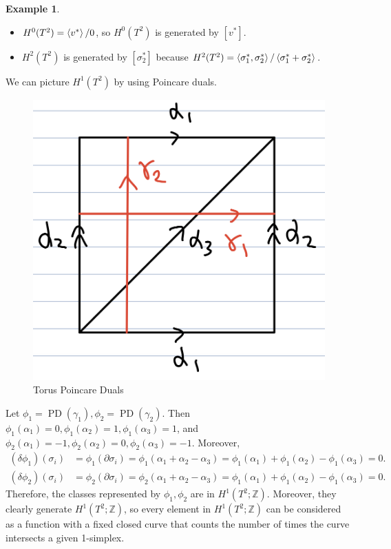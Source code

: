 \documentclass[psamsfonts]{amsart}
\theoremstyle{definition}
\newtheorem{exmp}[thm]{Example}
\theoremstyle{rem}
\DeclareMathOperator{\PD}{PD}
\numberwithin{equation}{section}
\begin{document}
\begin{exmp}
  \begin{itemize}
    \item
      $H^0(T^2) = \ev{v^{\ast}} / 0$, so $H^0(T^2)$ is generated by $[v^{\ast}]$.
    \item
      $H^2(T^2)$ is generated by $[\sigma_2^{\ast}]$ because $H^2(T^2) = \ev{\sigma_1^{\ast}, \sigma_2^{\ast}} / \ev{\sigma_1^{\ast} + \sigma_2^{\ast}}$.
  \end{itemize}
  We can picture $H^1(T^2)$ by using Poincare duals.
  \begin{figure}[!htb]
    \includegraphics[width=.5\linewidth]{img/torus_pd.jpeg}
    \caption{Torus Poincare Duals}
    \label{fig:torus_pds}
  \end{figure}
  Let $\phi_1 = \PD(\gamma_1), \phi_2 = \PD(\gamma_2)$.
  Then $\phi_1(\alpha_1) = 0, \phi_1(\alpha_2) = 1, \phi_1(\alpha_3) = 1$, and $\phi_2(\alpha_1) = -1, \phi_2(\alpha_2) = 0, \phi_2(\alpha_3) = -1$.
  Moreover,
  \begin{align*}
    (\delta\phi_1)(\sigma_i) &= \phi_1(\partial\sigma_i) = \phi_1(\alpha_1 + \alpha_2 - \alpha_3) = \phi_1(\alpha_1) + \phi_1(\alpha_2) - \phi_1(\alpha_3) = 0. \\
    (\delta\phi_2)(\sigma_i) &= \phi_2(\partial\sigma_i) = \phi_2(\alpha_1 + \alpha_2 - \alpha_3) = \phi_1(\alpha_1) + \phi_1(\alpha_2) - \phi_1(\alpha_3) = 0.
  \end{align*}
  Therefore, the classes represented by $\phi_1, \phi_2$ are in $H^1(T^2; \mathbb{Z})$.
  Moreover, they clearly generate $H^1(T^2; \mathbb{Z})$, so every element in $H^1(T^2; \mathbb{Z})$ can be considered as a function with a fixed closed curve that counts the number of times the curve intersects a given 1-simplex.


\end{exmp}
\end{document}
